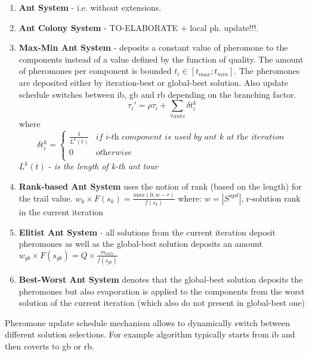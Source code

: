 \begin{enumerate}
\item {\textbf{Ant System} - i.e. without extensions.}

\item {\textbf{Ant Colony System} - TO-ELABORATE + local ph. update!!!.}

\item \textbf{Max-Min Ant System} - deposits a constant value of pheromone to the components instead of a value defined by the function of quality. The amount of pheromones per component is bounded $t_i \in [t_{max};t_{min}]$. The pheromones are deposited either by iteration-best or global-best solution. Also update schedule switches between ib, gb and rb depending on the branching factor.
\begin{equation}
\tau_i' = \rho \tau_i + \sum \limits_{\forall ants} \delta t_i^k
\end{equation}
where
\[
\delta t_i^k =
\left\{
\begin{array}{ll}
      \frac{1}{L^k(t)} & \textit{if i-th component is used by ant k at the iteration}\\
      0 & \textit{otherwise} \\
\end{array} 
\right. 
\]
$L^k(t)$ - \textit{is the length of k-th ant tour}

\item {\textbf{Rank-based Ant System} uses the notion of rank (based on the length) for the trail value.
$w_k \times F(s_k) = \frac{max(0,w-r)}{f(s_k)}$
where: $w=|S^{upd}|$, r-solution rank in the current iteration
}

\item {\textbf{Elitist Ant System} - all solutions from the current iteration deposit pheromones as well as the global-best solution deposits an amount $w_{gb} \times F(s_{gb}) = Q \times \frac{m_{elite}}{f(s_{gb})}$ }

\item {\textbf{Best-Worst Ant System} denotes that the global-best solution deposits the pheromones but also evaporation is applied to the components from the worst solution of the current iteration (which also do not present in global-best one)}

\end{enumerate}

Pheromone update schedule mechanism allows to dynamically switch between different solution selections. For example algorithm typically starts from ib and then coverts to gb or rb.



